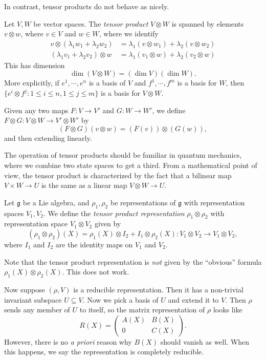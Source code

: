 \documentclass[a4paper]{article}
\begin{document}
In contrast, tensor products do not behave as nicely.
\begin{defi}
  Let $V, W$ be vector spaces. The \emph{tensor product} $V \otimes W$ is spanned by elements $v \otimes w$, where $v \in V$ and $w \in W$, where we identify
  \begin{align*}
    v \otimes (\lambda_1 w_1 + \lambda_2 w_2) &= \lambda_1 (v \otimes w_1) + \lambda_2 (v \otimes w_2)\\
    (\lambda_1 v_1 + \lambda_2 v_2) \otimes w &= \lambda_1 (v_1 \otimes w) + \lambda_2 (v_2 \otimes w)
  \end{align*}
  This has dimension
  \[
    \dim (V \otimes W) = (\dim V)(\dim W).
  \]
  More explicitly, if $e^1, \cdots, e^n$ is a basis of $V$ and $f^1 ,\cdots, f^m$ is a basis for $W$, then $\{e^i \otimes f^j: 1 \leq i \leq n, 1 \leq j \leq m\}$ is a basis for $V \otimes W$.

  Given any two maps $F: V \to V'$ and $G: W \to W'$, we define $F \otimes G: V \otimes W \to V' \otimes W'$ by
  \[
    (F \otimes G) (v \otimes w) = (F(v)) \otimes (G(w)),
  \]
  and then extending linearly.
\end{defi}
The operation of tensor products should be familiar in quantum mechanics, where we combine two state spaces to get a third. From a mathematical point of view, the tensor product is characterized by the fact that a bilinear map $V \times W \to U$ is the same as a linear map $V \otimes W \to U$.

\begin{defi}
  Let $\mathfrak{g}$ be a Lie algebra, and $\rho_1, \rho_2$ be representations of $\mathfrak{g}$ with representation spaces $V_1, V_2$. We define the \emph{tensor product representation} $\rho_1 \otimes \rho_2$ with representation space $V_1 \otimes V_2$ given by
  \[
    (\rho_1 \otimes \rho_2)(X) = \rho_1(X) \otimes I_2 + I_1 \otimes \rho_2(X): V_1 \otimes V_2 \to V_1 \otimes V_2,
  \]
  where $I_1$ and $I_2$ are the identity maps on $V_1$ and $V_2$.
\end{defi}

Note that the tensor product representation is \emph{not} given by the ``obvious'' formula $\rho_1(X) \otimes \rho_2(X)$. This does not work.

Now suppose $(\rho, V)$ is a reducible representation. Then it has a non-trivial invariant subspace $U \subseteq V$. Now we pick a basis of $U$ and extend it to $V$. Then $\rho$ sends any member of $U$ to itself, so the matrix representation of $\rho$ looks like
\[
  R(X) =
  \begin{pmatrix}
    A(X) & B(X)\\
    0 & C(X)
  \end{pmatrix}.
\]
However, there is no \emph{a priori} reason why $B(X)$ should vanish as well. When this happens, we say the representation is completely reducible.
\end{document}

